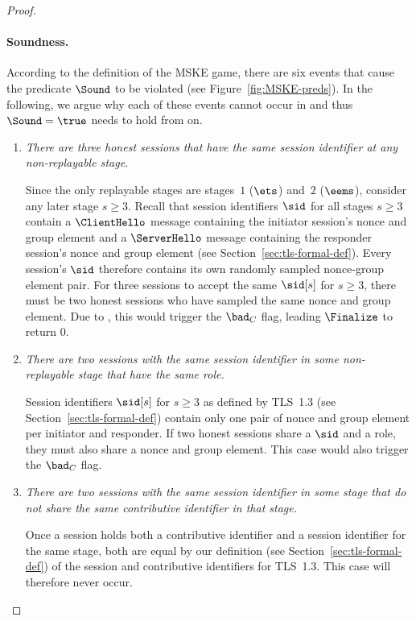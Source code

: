 \begin{proof}
\paragraph{Soundness.}
According to the definition of the MSKE game, there are six events that cause the predicate $\Sound$ to be violated (see Figure~\ref{fig:MSKE-preds}).
In the following, we argue why each of these events cannot occur in \thisGame and thus $\Sound = \true$ needs to hold from \thisGame on.
%
\begin{enumerate}
	\item \textit{There are three honest sessions that have the same session identifier at any non-replayable stage.}
	
	Since the only replayable stages are stages~$1$ ($\ets$) and~$2$ ($\eems$), consider any later stage $s \geq 3$.
	Recall that session identifiers $\sid$ for all stages $s\geq 3$ contain a $\ClientHello$ message containing the initiator session's nonce and group element and a $\ServerHello$ message containing the responder session's nonce and group element (see Section~\ref{sec:tls-formal-def}).
	Every session's $\sid$ therefore contains its own randomly sampled nonce-group element pair.
	For three sessions to accept the same $\sid[s]$ for $s \geq 3$, there must be two honest sessions who have sampled the same nonce and group element.
	Due to , this would trigger the $\bad_C$ flag, leading $\Finalize$ to return $0$.

	\item \textit{There are two sessions with the same session identifier in some non-replayable stage that have the same role.}
	
	Session identifiers $\sid[s]$ for $s \geq 3$ as defined by TLS~1.3 (see Section~\ref{sec:tls-formal-def}) contain only one pair of nonce and group element per initiator and responder.
	If two honest sessions share a $\sid$ and a role, they must also share a nonce and group element.
	This case would also trigger the $\bad_C$ flag. 
	
	\item \textit{There are two sessions with the same session identifier in some stage that do not share the same contributive identifier in that stage.}
	
	Once a session holds both a contributive identifier and a session identifier for the same stage, both are equal by our definition (see Section~\ref{sec:tls-formal-def}) of the session and contributive identifiers for TLS~1.3.
	This case will therefore never occur.
	

\end{enumerate}
\end{proof}

